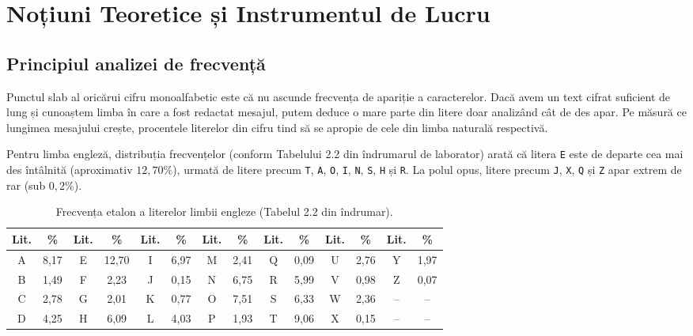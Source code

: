 \documentclass{labreport}
\begin{document}
\section{Noțiuni Teoretice și Instrumentul de Lucru}

\subsection{Principiul analizei de frecvență}

Punctul slab al oricărui cifru monoalfabetic este că nu ascunde frecvența de apariție a caracterelor. Dacă avem un text cifrat suficient de lung și cunoaștem limba în care a fost redactat mesajul, putem deduce o mare parte din litere doar analizând cât de des apar. Pe măsură ce lungimea mesajului crește, procentele literelor din cifru tind să se apropie de cele din limba naturală respectivă.

Pentru limba engleză, distribuția frecvențelor (conform Tabelului 2.2 din îndrumarul de laborator) arată că litera \texttt{E} este de departe cea mai des întâlnită (aproximativ $12{,}70\%$), urmată de litere precum \texttt{T}, \texttt{A}, \texttt{O}, \texttt{I}, \texttt{N}, \texttt{S}, \texttt{H} și \texttt{R}. La polul opus, litere precum \texttt{J}, \texttt{X}, \texttt{Q} și \texttt{Z} apar extrem de rar (sub $0{,}2\%$).

\begin{table}[H]
\centering
\footnotesize
\setlength{\tabcolsep}{4pt}
\caption{Frecvența etalon a literelor limbii engleze (Tabelul 2.2 din îndrumar).}
\label{tab:ref_english}
\begin{tabular}{cc|cc|cc|cc|cc|cc|cc}
\toprule
\textbf{Lit.} & \textbf{\%} & \textbf{Lit.} & \textbf{\%} & \textbf{Lit.} & \textbf{\%} & \textbf{Lit.} & \textbf{\%} & \textbf{Lit.} & \textbf{\%} & \textbf{Lit.} & \textbf{\%} & \textbf{Lit.} & \textbf{\%} \\
\midrule
A & 8,17 & E & 12,70 & I & 6,97 & M & 2,41 & Q & 0,09 & U & 2,76 & Y & 1,97 \\
B & 1,49 & F & 2,23  & J & 0,15 & N & 6,75 & R & 5,99 & V & 0,98 & Z & 0,07 \\
C & 2,78 & G & 2,01  & K & 0,77 & O & 7,51 & S & 6,33 & W & 2,36 & -- & -- \\
D & 4,25 & H & 6,09  & L & 4,03 & P & 1,93 & T & 9,06 & X & 0,15 & -- & -- \\
\bottomrule
\end{tabular}
\end{table}
\end{document}
